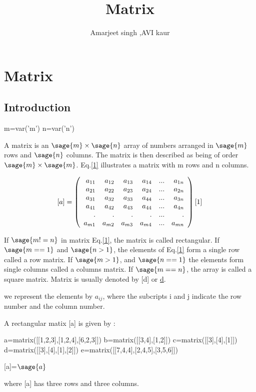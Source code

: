 \documentclass[12pt]{report}
\title{\textbf{Matrix}}
\author{Amarjeet singh ,AVI kaur}
\begin{document}
\begin{titlepage}
\maketitle
\end{titlepage}
\chapter{Matrix}
\section{Introduction}
\begin{sagesilent}
m=var('m')
n=var('n')
\end{sagesilent}

A matrix is an $\sage{m} \times \sage{n}$  array of numbers arranged in $\sage{m}$ rows and $\sage{n}$ columns. The matrix is then described as being of order $\sage{m} \times \sage{m}$. Eq.\ref{1} illustrates a matrix with m rows and n columns.



\[[a]=\left(\begin{array}{rrrrrr}
a_{11} & a_{12} & a_{13} & a_{14} & ... & a_{1n} \\
a_{21} & a_{22} & a_{23} & a_{24} & ... & a_{2n} \\
a_{31} & a_{32} & a_{33} & a_{44} & ... & a_{3n} \\
a_{41} & a_{42} & a_{43} & a_{44} & ... & a_{4n} \\
.     & .     & .     & .     & ... & .     \\
a_{m1} & a_{m2} & a_{m3} & a_{m4} & ... & a_{mn} \\
\end{array}\right) \label{1} 
\ref{1} \] 

If $\sage{m!=n}$ in matrix Eq.\ref{1}, the matrix is called rectangular. If $\sage{m==1}$ and $\sage{n>1}$, the elements of Eq.\ref{1} form a single row called a row matrix. If $\sage{m>1}$, and $\sage{n==1}$ the elements form single columns called a columns matrix. If $\sage{m==n}$, the array is called a square matrix.
Matrix is usually denoted by [d] or \underline{d}.

we represent the elements by $a_{{ij}}$, where the subcripts i and j indicate the row number and the column number.

A rectangular matix [a] is given by : 
\begin{sagesilent}
a=matrix([[1,2,3],[1,2,4],[6,2,3]])
b=matrix([[3,4],[1,2]])
c=matrix([[3],[4],[1]])
d=matrix([[3],[4],[1],[2]])
e=matrix([[7,4,4],[2,4,5],[3,5,6]])
\end{sagesilent}
\begin{center}
[a]=$\sage{a}$
\end{center}
where [a] has three rows and three columns.
\end{document}
